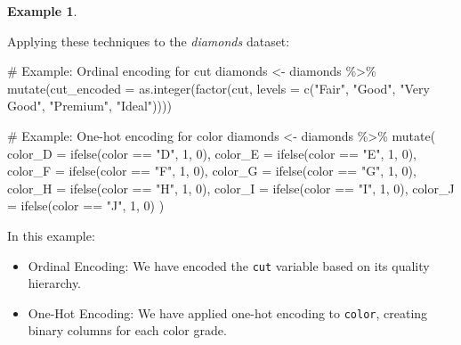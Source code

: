 \documentclass[
  11pt,
]{book}
\makeatletter
\newenvironment{Shaded}{}{}
\newcommand{\AttributeTok}[1]{#1}
\newcommand{\CommentTok}[1]{\textcolor[rgb]{0.36,0.36,0.36}{#1}}
\newcommand{\DecValTok}[1]{#1}
\newcommand{\FunctionTok}[1]{#1}
\newcommand{\NormalTok}[1]{#1}
\newcommand{\OtherTok}[1]{\textcolor[rgb]{0.39,0.39,0.39}{#1}}
\newcommand{\SpecialCharTok}[1]{\textcolor[rgb]{0.39,0.39,0.39}{#1}}
\newcommand{\StringTok}[1]{\textcolor[rgb]{0.39,0.39,0.39}{#1}}
\providecommand{\tightlist}{%
  \setlength{\itemsep}{0pt}\setlength{\parskip}{0pt}}
\newenvironment{kframe}{%
\medskip{}
\setlength{\fboxsep}{.8em}
 \def\at@end@of@kframe{}%
 \ifinner\ifhmode%
  \def\at@end@of@kframe{\end{minipage}}%
  \begin{minipage}{\columnwidth}%
 \fi\fi%
 \def\FrameCommand##1{\hskip\@totalleftmargin \hskip-\fboxsep
 \colorbox{shadecolor}{##1}\hskip-\fboxsep
     \hskip-\linewidth \hskip-\@totalleftmargin \hskip\columnwidth}%
 \MakeFramed {\advance\hsize-\width
   \@totalleftmargin\z@ \linewidth\hsize
   \@setminipage}}%
 {\par\unskip\endMakeFramed%
 \at@end@of@kframe}
\renewenvironment{Shaded}{\begin{kframe}}{\end{kframe}}
\theoremstyle{definition}
\theoremstyle{definition}
\newtheorem{example}{Example}[chapter]
\theoremstyle{definition}
\theoremstyle{definition}
\theoremstyle{remark}
\makeatother
\begin{document}
\begin{example}
\protect\hypertarget{exm:ex-encoding}{}\label{exm:ex-encoding}

Applying these techniques to the \emph{diamonds} dataset:

\begin{Shaded}
\begin{Highlighting}[]
\CommentTok{\# Example: Ordinal encoding for \textasciigrave{}cut\textasciigrave{}}
\NormalTok{diamonds }\OtherTok{\textless{}{-}}\NormalTok{ diamonds }\SpecialCharTok{\%\textgreater{}\%}
  \FunctionTok{mutate}\NormalTok{(}\AttributeTok{cut\_encoded =} \FunctionTok{as.integer}\NormalTok{(}\FunctionTok{factor}\NormalTok{(cut, }\AttributeTok{levels =} \FunctionTok{c}\NormalTok{(}\StringTok{"Fair"}\NormalTok{, }\StringTok{"Good"}\NormalTok{, }\StringTok{"Very Good"}\NormalTok{, }\StringTok{"Premium"}\NormalTok{, }\StringTok{"Ideal"}\NormalTok{))))}

\CommentTok{\# Example: One{-}hot encoding for \textasciigrave{}color\textasciigrave{}}
\NormalTok{diamonds }\OtherTok{\textless{}{-}}\NormalTok{ diamonds }\SpecialCharTok{\%\textgreater{}\%}
  \FunctionTok{mutate}\NormalTok{(}
    \AttributeTok{color\_D =} \FunctionTok{ifelse}\NormalTok{(color }\SpecialCharTok{==} \StringTok{"D"}\NormalTok{, }\DecValTok{1}\NormalTok{, }\DecValTok{0}\NormalTok{),}
    \AttributeTok{color\_E =} \FunctionTok{ifelse}\NormalTok{(color }\SpecialCharTok{==} \StringTok{"E"}\NormalTok{, }\DecValTok{1}\NormalTok{, }\DecValTok{0}\NormalTok{),}
    \AttributeTok{color\_F =} \FunctionTok{ifelse}\NormalTok{(color }\SpecialCharTok{==} \StringTok{"F"}\NormalTok{, }\DecValTok{1}\NormalTok{, }\DecValTok{0}\NormalTok{),}
    \AttributeTok{color\_G =} \FunctionTok{ifelse}\NormalTok{(color }\SpecialCharTok{==} \StringTok{"G"}\NormalTok{, }\DecValTok{1}\NormalTok{, }\DecValTok{0}\NormalTok{),}
    \AttributeTok{color\_H =} \FunctionTok{ifelse}\NormalTok{(color }\SpecialCharTok{==} \StringTok{"H"}\NormalTok{, }\DecValTok{1}\NormalTok{, }\DecValTok{0}\NormalTok{),}
    \AttributeTok{color\_I =} \FunctionTok{ifelse}\NormalTok{(color }\SpecialCharTok{==} \StringTok{"I"}\NormalTok{, }\DecValTok{1}\NormalTok{, }\DecValTok{0}\NormalTok{),}
    \AttributeTok{color\_J =} \FunctionTok{ifelse}\NormalTok{(color }\SpecialCharTok{==} \StringTok{"J"}\NormalTok{, }\DecValTok{1}\NormalTok{, }\DecValTok{0}\NormalTok{)}
\NormalTok{  )}
\end{Highlighting}
\end{Shaded}

In this example:

\begin{itemize}
\tightlist
\item
  Ordinal Encoding: We have encoded the \texttt{cut} variable based on its quality hierarchy.
\item
  One-Hot Encoding: We have applied one-hot encoding to \texttt{color}, creating binary columns for each color grade.
\end{itemize}

\end{example}
\end{document}
